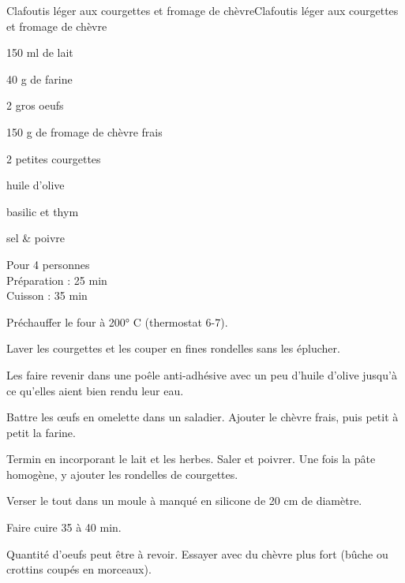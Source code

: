 \begin{recette}{Clafoutis léger aux courgettes et fromage de chèvre}{Clafoutis léger aux courgettes et fromage de chèvre}

\begin{ingredients}
150 ml de lait\par
40 g de farine\par
2 gros oeufs\par
150 g de fromage de chèvre frais\par
2 petites courgettes\par
huile d'olive\par
basilic et thym\par
sel \& poivre\par
\end{ingredients}

\begin{infos}
Pour 4 personnes\\
Préparation : 25 min\\
Cuisson : 35 min\\
\end{infos}

\begin{etapes}
\item Préchauffer le four à 200° C (thermostat 6-7).
\item Laver les courgettes et les couper en fines rondelles sans les éplucher.
\item Les faire revenir dans une poêle anti-adhésive avec un peu d'huile d'olive jusqu'à ce qu'elles aient bien rendu leur eau.
\item Battre les œufs en omelette dans un saladier. Ajouter le chèvre frais, puis petit à petit la farine.
\item Termin en incorporant le lait et les herbes. Saler et poivrer. Une fois la pâte homogène, y ajouter les rondelles de courgettes.
\item Verser le tout dans un moule à manqué en silicone de 20 cm de diamètre.
\item Faire cuire 35 à 40 min.
\end{etapes}

\begin{conseils}
Quantité d'oeufs peut être à revoir.
Essayer avec du chèvre plus fort (bûche ou crottins coupés en morceaux).
\end{conseils}

\end{recette}